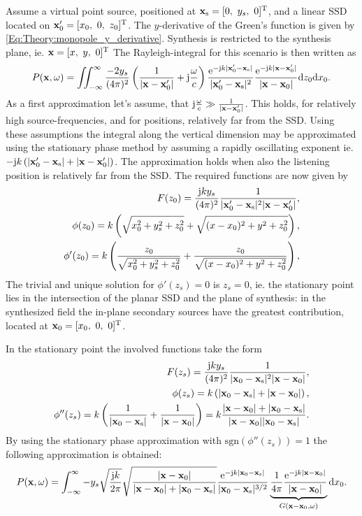 Assume a virtual point source, positioned at $\mathbf{x}_{\mathrm{s}} = [0,\ y_s,\ 0]^{\mathrm{T}}$, and a linear SSD located on $\vxo' = [x_0,\ 0 ,\ z_0]^{\mathrm{T}}$.
The $y$-derivative of the Green's function is given by \eqref{Eq:Theory:monopole_y_derivative}. 
Synthesis is restricted to the synthesis plane, ie. $\mathbf{x} = [x,\ y,\ 0]^{\mathrm{T}}$
The Rayleigh-integral for this scenario is then written as
\begin{equation}
P(\mathbf{x},\omega) = 
\iint_{-\infty}^{\infty}
\frac{-2 y_s}{(4\pi)^2}\left( \frac{1}{| \mathbf{x} - \mathbf{x}_0' |} + \mathrm{j} \frac{\omega}{c} \right) 
\frac{\mathrm{e}^{-\mathrm{j} k  | \mathbf{x}_0' - \mathbf{x}_{\mathrm{s}} | }}{| \mathbf{x}_0' - \mathbf{x}_{\mathrm{s}} |^2}
\frac{\mathrm{e}^{ -\mathrm{j} k | \mathbf{x} - \mathbf{x}_0' | }}{| \mathbf{x} - \mathbf{x}_0 |}
\mathrm{d} z_0 \mathrm{d} x_0.
\end{equation}
As a first approximation let's assume, that $\mathrm{j} \frac{\omega}{c} \gg \frac{1}{| \mathbf{x} - \mathbf{x}_0' |}$. This holds, for relatively high source-frequencies, and for positions, relatively far from the SSD. Using these assumptions the integral along the vertical dimension may be approximated using the stationary phase method by assuming a rapidly oscillating exponent ie. $-\mathrm{j} k \left(  | \mathbf{x}_0' - \mathbf{x}_{\mathrm{s}} | +| \mathbf{x} - \mathbf{x}_0' | \right)$. The approximation holds when also the listening position is relatively far from the SSD. The required functions are now given by
\begin{eqnarray}
F(z_0) = \frac{\mathrm{j} k y_s}{(4\pi)^2}\frac{1}{|\mathbf{x}_0'-\mathbf{x}_{\mathrm{s}}|^2 |\mathbf{x} - \mathbf{x}_0'|},
\\
\phi(z_0) = k \left( \sqrt{ x_0^2 + y_s^2 + z_0^2 } + \sqrt{ (x-x_0)^2 + y^2 + z_0^2 }  \right),
\\
\phi'(z_0) = k \left( \frac{z_0}{\sqrt{ x_0^2 + y_s^2 + z_0^2 } } + \frac{z_0}{\sqrt{ (x-x_0)^2 + y^2 + z_0^2 }} \right),
\end{eqnarray}
The trivial and unique solution for $\phi'(z_s) = 0$ is $z_s = 0$, ie. the stationary point lies in the intersection of the planar SSD and the plane of synthesis: in the synthesized field the in-plane secondary sources have the greatest contribution, located at $\mathbf{x}_0 = [x_0,\ 0 ,\ 0]^{\mathrm{T}}$.

In the stationary point the involved functions take the form
\begin{eqnarray}
F(z_s) = \frac{\mathrm{j} k y_s}{(4\pi)^2}\frac{1}{|\mathbf{x}_0-\mathbf{x}_{\mathrm{s}}|^2 |\mathbf{x} - \mathbf{x}_0|},
\\
\phi(z_s) = k \left( |\mathbf{x}_0 - \mathbf{x}_{\mathrm{s}}| + |\mathbf{x} - \mathbf{x}_0| \right),
\\
\phi''(z_s) = k \left( \frac{1}{|\mathbf{x}_0 - \mathbf{x}_{\mathrm{s}}|} + \frac{1}{|\mathbf{x} - \mathbf{x}_0|} \right) = k\frac{|\mathbf{x} - \mathbf{x}_0| + |\mathbf{x}_0 - \mathbf{x}_{\mathrm{s}}|}{|\mathbf{x} - \mathbf{x}_0| |\mathbf{x}_0 - \mathbf{x}_{\mathrm{s}}|}.
\end{eqnarray}
By using the stationary phase approximation with $\mathrm{sgn}\left( \phi''(z_s) \right) = 1$ the following approximation is obtained:
\begin{equation}
P(\mathbf{x},\omega) = \int_{-\infty}^{\infty} 
-y_s\sqrt{\frac{\mathrm{j} k}{2 \pi}}
\sqrt{ \frac{|\mathbf{x} - \mathbf{x}_0|}{|\mathbf{x} - \mathbf{x}_0| + |\mathbf{x}_0 - \mathbf{x}_{\mathrm{s}}|}}
\frac{\mathrm{e}^{-\mathrm{j} k  |\mathbf{x}_0 - \mathbf{x}_{\mathrm{s}}| }}{|\mathbf{x}_0-\mathbf{x}_{\mathrm{s}}|^{3/2} }
\underbrace{\frac{1}{4\pi}
\frac{\mathrm{e}^{-\mathrm{j} k |\mathbf{x} - \mathbf{x}_0| }}{|\mathbf{x} - \mathbf{x}_0|}}_{G(\mathbf{x}-\mathbf{x}_0,\omega)}
 \mathrm{d} x_0.
\end{equation}

